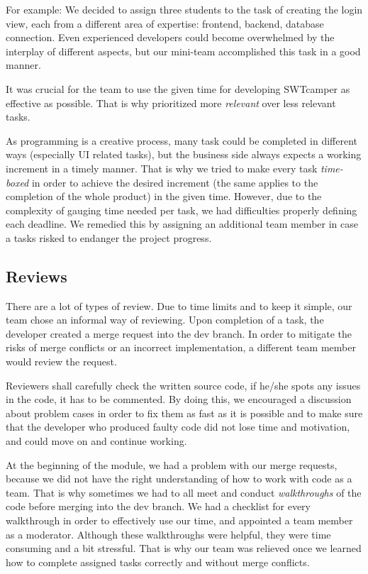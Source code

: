 For example: We decided to assign three students to the task of creating the login view, each from a different area of expertise: frontend, backend, database connection. Even experienced developers could become overwhelmed by the interplay of different aspects, but our mini-team accomplished this task in a good manner.

It was crucial for the team to use the given time for developing SWTcamper as effective as possible. That is why prioritized more \emph{relevant} over less relevant tasks.

As programming is a creative process, many task could be completed in different ways (especially UI related tasks), but the business side always expects a working increment in a timely manner. That is why we tried to make every task \emph{time-boxed} in order to achieve the desired increment (the same applies to the completion of the whole product) in the given time. However, due to the complexity of gauging time needed per task, we had difficulties properly defining each deadline. We remedied this by assigning an additional team member in case a tasks risked to endanger the project progress.

\subsection{Reviews}
There are a lot of types of review. Due to time limits and to keep it simple, our team chose an informal way of reviewing. Upon completion of a task, the developer created a merge request into the dev branch. In order to mitigate the risks of merge conflicts or an incorrect implementation, a different team member would review the request.

Reviewers shall carefully check the written source code, if he/she spots any issues in the code, it has to be commented. By doing this, we encouraged a discussion about problem cases in order to fix them as fast as it is possible and to make sure that the developer who produced faulty code did not lose time and motivation, and could move on and continue working.

At the beginning of the module, we had a problem with our merge requests, because we did not have the right understanding of how to work with code as a team. That is why sometimes we had to all meet and conduct \emph{walkthroughs} of the code before merging into the dev branch. We had a checklist for every walkthrough in order to effectively use our time, and appointed a team member as a moderator. Although these walkthroughs were helpful, they were time consuming and a bit stressful. That is why our team was relieved once we learned how to complete assigned tasks correctly and without merge conflicts.

